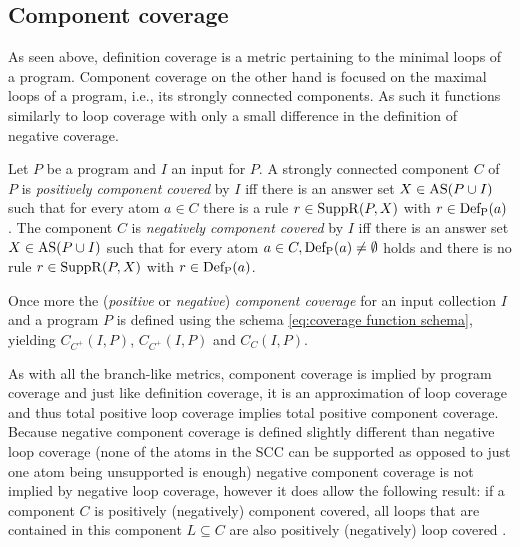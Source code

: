 \subsection{Component coverage}
\label{subsec:Coverage cetrics/Branch-like coverage/Component coverage}
As seen above, definition coverage is a metric pertaining to the minimal loops of a program. Component coverage on the other hand is focused on the maximal loops of a program, i.e., its strongly connected components. As such it functions similarly to loop coverage with only a small difference in the definition of negative coverage.

\begin{definition}
\label{def:component coverage}
    Let $P$ be a program and $I$ an input for $P$. A strongly connected component $C$ of $P$ is \emph{positively component covered} by $I$ iff there is an answer set \(X \in \operatorname{AS}(P \cup I)\) such that for every atom \(a \in C\) there is a rule \(r \in \operatorname{SuppR}(P, X)\) with \(r \in \operatorname{Def_P}(a)\).
    The component $C$ is \emph{negatively component covered} by $I$ iff there is an answer set \(X \in \operatorname{AS}(P \cup I)\) such that for every atom \(a \in C, \operatorname{Def_P}(a) \neq \emptyset\) holds and there is no rule \(r \in \operatorname{SuppR}(P, X)\) with \(r \in \operatorname{Def_P}(a)\).
\end{definition}

Once more the (\emph{positive} or \emph{negative}) \emph{component coverage} for an input collection $I$ and a program $P$ is defined using the schema \ref{eq:coverage function schema}, yielding \(C_{C^+}(I, P)\), \(C_{C^+}(I, P)\) and \(C_{C}(I, P)\).

As with all the branch-like metrics, component coverage is implied by program coverage and just like definition coverage, it is an approximation of loop coverage and thus total positive loop coverage implies total positive component coverage.
Because negative component coverage is defined slightly different than negative loop coverage (none of the atoms in the SCC can be supported as opposed to just one atom being unsupported is enough) negative component coverage is not implied by negative loop coverage, however it does allow the following result: if a component $C$ is positively (negatively) component covered, all loops that are contained in this component \(L \subseteq C\) are also positively (negatively) loop covered \cite[Theorem 7]{Jan+10}.

